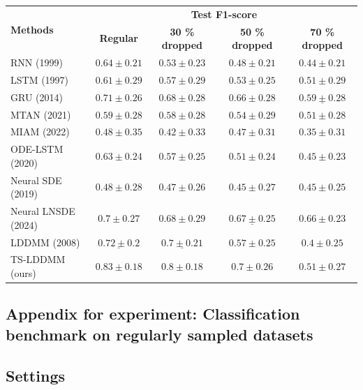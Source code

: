 \begin{table}[hbt!]
  \centering
  \begin{tabular}{lcccc}
    \toprule
    \multirow[c]{2}{*}{\textbf{Methods}} & \multicolumn{4}{c}{\textbf{Test F1-score}} \\
    \cline{2-5}
     &  \textbf{Regular} & \textbf{30 \% dropped} &  \textbf{50 \% dropped} & \textbf{70 \% dropped} \\
    \midrule
    RNN (1999) & $0.64 \pm 0.21$ & $0.53 \pm 0.23$ & $0.48 \pm 0.21$ & $0.44 \pm 0.21$ \\
    LSTM (1997) & $0.61 \pm 0.29$ & $0.57 \pm 0.29$ & $0.53 \pm 0.25$ & $0.51 \pm 0.29$ \\
    GRU (2014) & $0.71 \pm 0.26$ & $0.68 \pm 0.28$ & $0.66 \pm 0.28$ & $\underline{0.59 \pm 0.28}$ \\
    MTAN (2021) & $0.59 \pm 0.28$ & $0.58 \pm 0.28$ & $0.54 \pm 0.29$ & $0.51 \pm 0.28$ \\
    MIAM (2022) & $0.48 \pm 0.35$ & $0.42 \pm 0.33$ & $0.47 \pm 0.31$ & $0.35 \pm 0.31$ \\
    ODE-LSTM (2020) & $0.63 \pm 0.24$ & $0.57 \pm 0.25$ & $0.51 \pm 0.24$ & $0.45 \pm 0.23$ \\
    Neural SDE (2019) & $0.48 \pm 0.28$ & $0.47 \pm 0.26$ & $0.45 \pm 0.27$ & $0.45 \pm 0.25$ \\
    Neural LNSDE (2024) & $0.7 \pm 0.27$ & $0.68 \pm 0.29$ & $\underline{0.67 \pm 0.25}$ & $\mathbf{0.66 \pm 0.23}$ \\
    LDDMM (2008) & $\underline{0.72 \pm 0.2}$ & $\underline{0.7 \pm 0.21}$ & $0.57 \pm 0.25$ & $0.4 \pm 0.25$ \\
    TS-LDDMM (ours) & $\mathbf{0.83 \pm 0.18}$ & $\mathbf{0.8 \pm 0.18}$ & $\mathbf{0.7 \pm 0.26}$ & $0.51 \pm 0.27$ \\
    \bottomrule
  \end{tabular}  
\end{table}




\subsection{Appendix for experiment: Classification benchmark on regularly sampled datasets}
\subsection{Settings}
\label{appendix: settings_classification}

